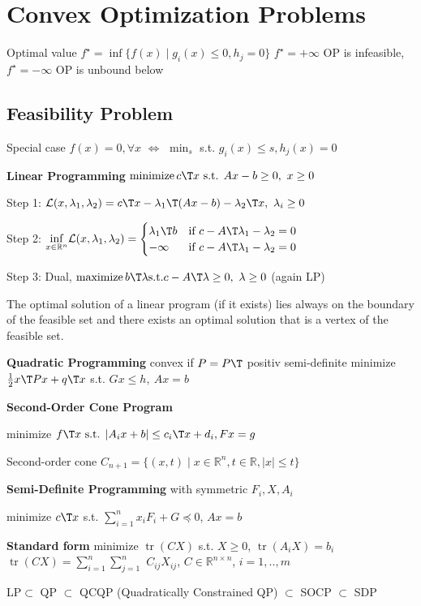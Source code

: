 \section{Convex Optimization Problems}

Optimal value $f^\star =
	\operatorname{inf}\{f(x)\mid
	g_i(x)\le0,h_j=0 \}$
$f^\star=+\infty$ OP is infeasible,
$f^\star=-\infty$ OP is unbound below

\subsection{Feasibility  Problem}


Special case $f(x)=0,\forall x$
$\Leftrightarrow$
$\min_s$ s.t. $g_i(x)\le s,h_j(x)=0$

\textbf{Linear Programming}
$ \operatorname{minimize} c\T x
	\text{ s.t. } Ax-b \ge 0,\ x\ge0$

Step 1:
$\mathcal{L}(x,\lambda_1,\lambda_2) =
	c\T x-\lambda_1\T (Ax-b) -\lambda_2\T x,\ \lambda_i \ge0$

Step 2:
$\underset{x \in \mathcal{\mathbb{R}}^n}{\operatorname{inf}}
	\mathcal{L}(x,\lambda_1,\lambda_2)
	= \begin{cases} \lambda_1\T b & \text{if }c-A\T\lambda_1-\lambda_2=0  \\
              -\infty       & \text{if } c-A\T\lambda_1-\lambda_2=0\end{cases}$

Step 3: Dual,
$\operatorname{maximize} b\T\lambda
	\text{s.t.}
	c-A\T\lambda \ge 0,\ \lambda\ge0$
(again LP)

\begin{proposition}
	The optimal solution of a linear program (if it exists)
	lies always on the boundary of the feasible set
	and there exists an optimal solution that is a vertex of the feasible set.
\end{proposition}


\textbf{Quadratic Programming}
convex if $P=P\T$ positiv semi-definite
minimize $\frac{1}{2}x\T Px+q\T x$
s.t. $Gx\le h,\ Ax=b$


\textbf{Second-Order Cone Program}

minimize $f\T x \text{ s.t. }
	|A_ix+b|\le c_i\T x+d_i, Fx=g$

Second-order cone
$C_{n+1}=\{ (x,t)\mid
	x\in\mathbb{R}^{n}, t\in \mathbb{R}, |x|\le t \}$

\textbf{Semi-Definite Programming} with symmetric $F_i,X,A_i$

minimize $c\T x$
s.t.
$\sum_{i=1}^{n}x_iF_i+G\preceq0$,
$Ax=b$

\textbf{Standard form}
minimize $\operatorname{tr}(CX)$
s.t.
$X\ge0$,
$\operatorname{tr}(A_iX)=b_i$
$\operatorname{tr}(CX)=\sum_{i=1}^{n}\sum_{j=1}^{n}$
$C_{ij}X_{ij}$,
$C\in\mathbb{R}^{n\times n}$,
$i=1,..,m$

LP$\subset$ QP $\subset$ QCQP
\scriptsize
(Quadratically Constrained QP)
\footnotesize
$\subset$ SOCP $\subset$ SDP











